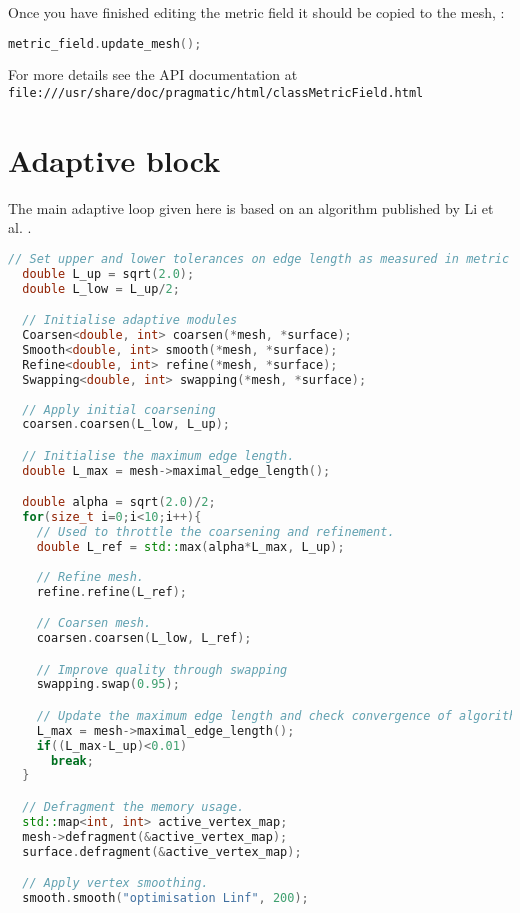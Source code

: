 Once you have finished editing the metric field it should be copied to
the mesh, \eg:
\begin{lstlisting}[language=C++]
  metric_field.update_mesh();
\end{lstlisting}

For more details see the API documentation at
\lstinline[language=html]+file:///usr/share/doc/pragmatic/html/classMetricField.html+

\section{Adaptive block}
The main adaptive loop given here is based on an algorithm published
by Li et al. \citep{li20053d}.

\begin{lstlisting}[language=C++]
  // Set upper and lower tolerances on edge length as measured in metric space.
  double L_up = sqrt(2.0);
  double L_low = L_up/2;

  // Initialise adaptive modules
  Coarsen<double, int> coarsen(*mesh, *surface);  
  Smooth<double, int> smooth(*mesh, *surface);
  Refine<double, int> refine(*mesh, *surface);
  Swapping<double, int> swapping(*mesh, *surface);
 
  // Apply initial coarsening
  coarsen.coarsen(L_low, L_up);

  // Initialise the maximum edge length.
  double L_max = mesh->maximal_edge_length();

  double alpha = sqrt(2.0)/2;  
  for(size_t i=0;i<10;i++){
    // Used to throttle the coarsening and refinement.
    double L_ref = std::max(alpha*L_max, L_up);
    
    // Refine mesh.
    refine.refine(L_ref);

    // Coarsen mesh.
    coarsen.coarsen(L_low, L_ref);

    // Improve quality through swapping
    swapping.swap(0.95);

    // Update the maximum edge length and check convergence of algorithm,
    L_max = mesh->maximal_edge_length();
    if((L_max-L_up)<0.01)
      break;
  }

  // Defragment the memory usage.  
  std::map<int, int> active_vertex_map;
  mesh->defragment(&active_vertex_map);
  surface.defragment(&active_vertex_map);

  // Apply vertex smoothing.
  smooth.smooth("optimisation Linf", 200);
\end{lstlisting}

